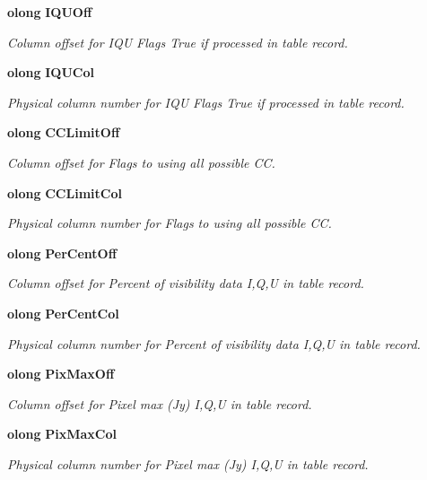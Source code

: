 \begin{CompactItemize}
{\bf olong} {\bf IQUOff}
\begin{CompactList}\small\item\em Column offset for IQU Flags True if processed in table record. \item\end{CompactList}\item 
{\bf olong} {\bf IQUCol}
\begin{CompactList}\small\item\em Physical column number for IQU Flags True if processed in table record. \item\end{CompactList}\item 
{\bf olong} {\bf CCLimit\-Off}
\begin{CompactList}\small\item\em Column offset for Flags to using all possible CC. \item\end{CompactList}\item 
{\bf olong} {\bf CCLimit\-Col}
\begin{CompactList}\small\item\em Physical column number for Flags to using all possible CC. \item\end{CompactList}\item 
{\bf olong} {\bf Per\-Cent\-Off}
\begin{CompactList}\small\item\em Column offset for Percent of visibility data I,Q,U in table record. \item\end{CompactList}\item 
{\bf olong} {\bf Per\-Cent\-Col}
\begin{CompactList}\small\item\em Physical column number for Percent of visibility data I,Q,U in table record. \item\end{CompactList}\item 
{\bf olong} {\bf Pix\-Max\-Off}
\begin{CompactList}\small\item\em Column offset for Pixel max (Jy) I,Q,U in table record. \item\end{CompactList}\item 
{\bf olong} {\bf Pix\-Max\-Col}
\begin{CompactList}\small\item\em Physical column number for Pixel max (Jy) I,Q,U in table record. \item\end{CompactList}\item 

\end{CompactItemize}
